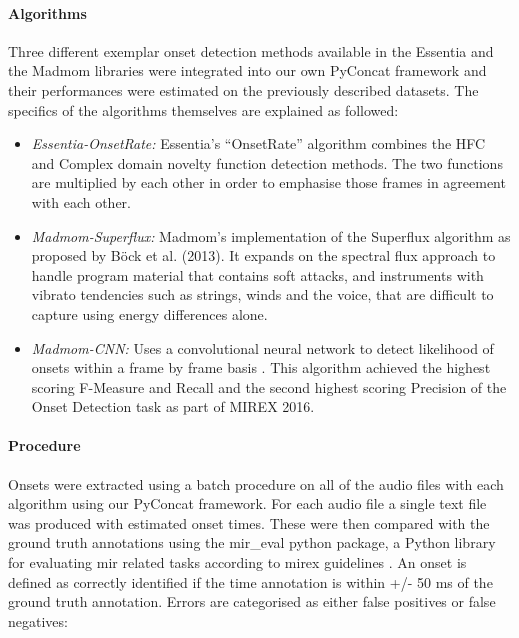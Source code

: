 \paragraph{Algorithms}

Three different exemplar onset detection methods available in the Essentia \citep{Bogdanov2013} and the Madmom \citep{Bock2016} libraries were integrated into our own PyConcat framework and their performances were estimated on the previously described datasets. The specifics of the algorithms themselves are explained as followed:

\begin{itemize}
  \item \textit{Essentia-OnsetRate:} Essentia’s “OnsetRate” algorithm combines the HFC and Complex domain novelty function detection methods. The two functions are multiplied by each other in order to emphasise those frames in agreement with each other. 
  \item \textit{Madmom-Superflux:} Madmom’s implementation of the Superflux algorithm as proposed by Böck et al. (2013). It expands on the spectral flux approach to handle program material that contains soft attacks, and instruments with vibrato tendencies such as strings, winds and the voice, that are difficult to capture using energy differences alone. 
  \item \textit{Madmom-CNN:} Uses a convolutional neural network to detect likelihood of onsets within a frame by frame basis \citep{Schluter2013, Schluter2014}. This algorithm achieved the highest scoring F-Measure and Recall and the second highest scoring Precision of the Onset Detection task as part of MIREX 2016.
\end{itemize}

\paragraph{Procedure}

Onsets were extracted using a batch procedure on all of the audio files with each algorithm using our PyConcat framework. For each audio file a single text file was produced with estimated onset times. These were then compared with the ground truth annotations using the mir\_eval python package, a Python library for evaluating \acrshort{mir} related tasks according to \acrshort{mirex} guidelines \citep{Raffel2014}. An onset is defined as correctly identified if the time annotation is within +/- 50 ms of the ground truth annotation. Errors are categorised as either false positives or false negatives:

